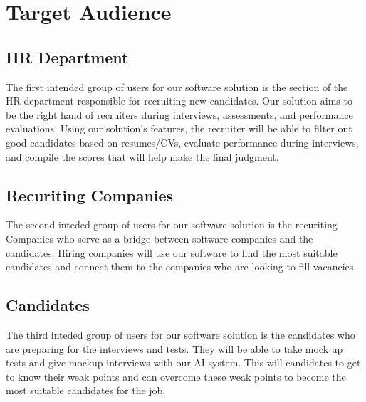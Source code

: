 \section{Target Audience}
\subsection{HR Department}
The first intended group of users for our software solution is the section of the HR department responsible for recruiting new candidates. Our solution aims to be the right hand of recruiters during interviews, assessments, and performance evaluations. Using our solution’s features, the recruiter will be able to filter out good candidates based on resumes/CVs, evaluate performance during interviews, and compile the scores that will help make the final judgment. 
\subsection{Recuriting Companies}
The second inteded group of users for our software solution is the recuriting Companies who serve as a bridge between software companies and the candidates. Hiring companies will use our software to find the most suitable candidates and connect them to the companies who are looking to fill vacancies.
\subsection{Candidates}
The third inteded group of users for our software solution is the candidates who are preparing for the interviews and tests. They will be able to take mock up tests and give mockup interviews with our AI system. This will candidates to get to know their weak points and can overcome these weak points to become the most suitable candidates for the job.